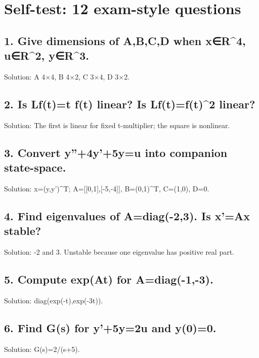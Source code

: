 \documentclass[11pt,a4paper]{article}
\begin{document}
\section{Self-test: 12 exam-style questions}

\subsection{1. Give dimensions of A,B,C,D when x∈R\textasciicircum{}4, u∈R\textasciicircum{}2, y∈R\textasciicircum{}3.}
\begin{exambox}Solution: A 4×4, B 4×2, C 3×4, D 3×2.\end{exambox}

\subsection{2. Is Lf(t)=t f(t) linear? Is Lf(t)=f(t)\textasciicircum{}2 linear?}
\begin{exambox}Solution: The first is linear for fixed t-multiplier; the square is nonlinear.\end{exambox}

\subsection{3. Convert y''+4y'+5y=u into companion state-space.}
\begin{exambox}Solution: x=(y,y')\textasciicircum{}T; A=[[0,1],[-5,-4]], B=(0,1)\textasciicircum{}T, C=(1,0), D=0.\end{exambox}

\subsection{4. Find eigenvalues of A=diag(-2,3). Is x'=Ax stable?}
\begin{exambox}Solution: -2 and 3. Unstable because one eigenvalue has positive real part.\end{exambox}

\subsection{5. Compute exp(At) for A=diag(-1,-3).}
\begin{exambox}Solution: diag(exp(-t),exp(-3t)).\end{exambox}

\subsection{6. Find G(s) for y'+5y=2u and y(0)=0.}
\begin{exambox}Solution: G(s)=2/(s+5).\end{exambox}
\end{document}
